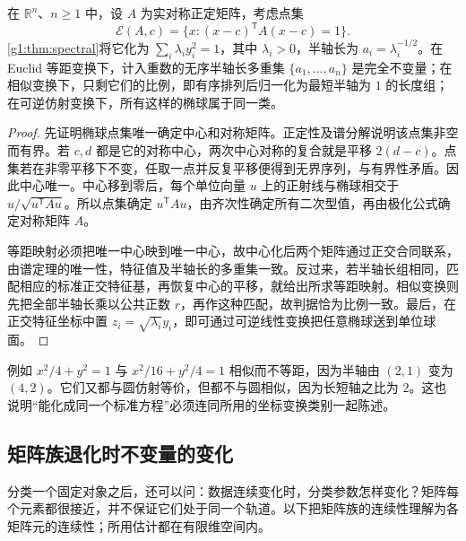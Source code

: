\begin{example}\label{g1:exm:ellipsoid-classification}
	在 \(\mathbb R^n\)、\(n\ge1\) 中，设 \(A\) 为实对称正定矩阵，考虑点集
	\[
		\mathcal E(A,c)=\{x:(x-c)^{\mathsf T}A(x-c)=1\}.
	\]
	\cref{g1:thm:spectral}将它化为 \(\sum_i\lambda_i y_i^2=1\)，其中 \(\lambda_i>0\)，半轴长为 \(a_i=\lambda_i^{-1/2}\)。在 Euclid 等距变换下，计入重数的无序半轴长多重集 \(\{a_1,\ldots,a_n\}\) 是完全不变量；在相似变换下，只剩它们的比例，即有序排列后归一化为最短半轴为 \(1\) 的长度组；在可逆仿射变换下，所有这样的椭球属于同一类。
\end{example}
\begin{proof}
	先证明椭球点集唯一确定中心和对称矩阵。正定性及谱分解说明该点集非空而有界。若 \(c,d\) 都是它的对称中心，两次中心对称的复合就是平移 \(2(d-c)\)。点集若在非零平移下不变，任取一点并反复平移便得到无界序列，与有界性矛盾。因此中心唯一。中心移到零后，每个单位向量 \(u\) 上的正射线与椭球相交于 \(u/\sqrt{u^{\mathsf T}Au}\)。所以点集确定 \(u^{\mathsf T}Au\)，由齐次性确定所有二次型值，再由极化公式确定对称矩阵 \(A\)。

	等距映射必须把唯一中心映到唯一中心，故中心化后两个矩阵通过正交合同联系，由谱定理的唯一性，特征值及半轴长的多重集一致。反过来，若半轴长组相同，匹配相应的标准正交特征基，再恢复中心的平移，就给出所求等距映射。相似变换则先把全部半轴长乘以公共正数 \(r\)，再作这种匹配，故判据恰为比例一致。最后，在正交特征坐标中置 \(z_i=\sqrt{\lambda_i}y_i\)，即可通过可逆线性变换把任意椭球送到单位球面。
\end{proof}

例如 \(x^2/4+y^2=1\) 与 \(x^2/16+y^2/4=1\) 相似而不等距，因为半轴由 \((2,1)\) 变为 \((4,2)\)。它们又都与圆仿射等价，但都不与圆相似，因为长短轴之比为 \(2\)。这也说明“能化成同一个标准方程”必须连同所用的坐标变换类别一起陈述。

\subsection{矩阵族退化时不变量的变化}
\label{g1:subsec:0104:04}

分类一个固定对象之后，还可以问：数据连续变化时，分类参数怎样变化？矩阵每个元素都很接近，并不保证它们处于同一个轨道。以下把矩阵族的连续性理解为各矩阵元的连续性；所用估计都在有限维空间内。

